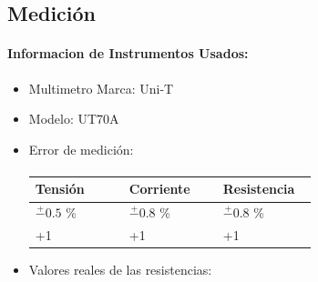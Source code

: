 \documentclass[a4paper,12pt]{article}
\begin{document}
\vspace{0.1cm}

\subsection{Medición}

\paragraph{Informacion de Instrumentos Usados:} 

\begin{itemize}
    \item Multimetro Marca: Uni-T
    \item Modelo: UT70A
    \item Error de medición:


\paragraph{}

\vspace{0.1cm}

\renewcommand{\arraystretch}{1.5}

\begin{table}[h]
    \centering
    \begin{tabular}{|>{\centering\arraybackslash}p{0.3\linewidth}|>{\centering\arraybackslash}p{0.3\linewidth}|>{\centering\arraybackslash}p{0.3\linewidth}|} \hline 
         Tensión&  Corriente& Resistencia\\ \hline 
         $\stackrel{+}{-} 0.5$ \%  &  $\stackrel{+}{-} 0.8$ \% & $\stackrel{+}{-} 0.8$ \% \\ \hline 
         +1&  +1& +1\\ \hline
    \end{tabular}
 
\end{table}

\item Valores reales de las resistencias:


\end{itemize}
\end{document}
